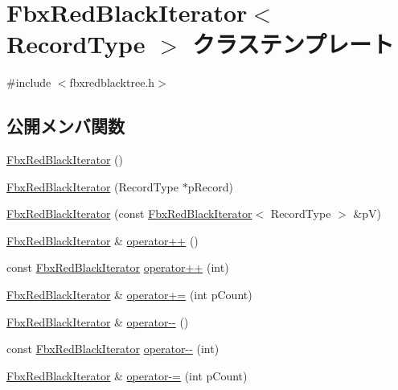 \hypertarget{class_fbx_red_black_iterator}{}\section{Fbx\+Red\+Black\+Iterator$<$ Record\+Type $>$ クラステンプレート}
\label{class_fbx_red_black_iterator}


{\ttfamily \#include $<$fbxredblacktree.\+h$>$}

\subsection*{公開メンバ関数}
\begin{DoxyCompactItemize}
\item 
\hyperlink{class_fbx_red_black_iterator_ad65b0d26a7a2baff0214104479303833}{Fbx\+Red\+Black\+Iterator} ()
\item 
\hyperlink{class_fbx_red_black_iterator_a596005a983b700722325897b905de913}{Fbx\+Red\+Black\+Iterator} (Record\+Type $\ast$p\+Record)
\item 
\hyperlink{class_fbx_red_black_iterator_a746e622a5d8be2f6ff7b48314b418c9d}{Fbx\+Red\+Black\+Iterator} (const \hyperlink{class_fbx_red_black_iterator}{Fbx\+Red\+Black\+Iterator}$<$ Record\+Type $>$ \&pV)
\item 
\hyperlink{class_fbx_red_black_iterator}{Fbx\+Red\+Black\+Iterator} \& \hyperlink{class_fbx_red_black_iterator_a1ea196cc2fcdc233f26ba205741c8d08}{operator++} ()
\item 
const \hyperlink{class_fbx_red_black_iterator}{Fbx\+Red\+Black\+Iterator} \hyperlink{class_fbx_red_black_iterator_a58492d2dddc2067ca0cec9bd8348d2cd}{operator++} (int)
\item 
\hyperlink{class_fbx_red_black_iterator}{Fbx\+Red\+Black\+Iterator} \& \hyperlink{class_fbx_red_black_iterator_aced77a1a0958e3f5d0b8f1a9cc47b42d}{operator+=} (int p\+Count)
\item 
\hyperlink{class_fbx_red_black_iterator}{Fbx\+Red\+Black\+Iterator} \& \hyperlink{class_fbx_red_black_iterator_a586034c7ed6bf9ecdda3e21861d51a11}{operator-\/-\/} ()
\item 
const \hyperlink{class_fbx_red_black_iterator}{Fbx\+Red\+Black\+Iterator} \hyperlink{class_fbx_red_black_iterator_a29bd733723bc879fb8057d7ae55279b4}{operator-\/-\/} (int)
\item 
\hyperlink{class_fbx_red_black_iterator}{Fbx\+Red\+Black\+Iterator} \& \hyperlink{class_fbx_red_black_iterator_ab659f3099189e3b8f9b3c1dd12c7b6bd}{operator-\/=} (int p\+Count)

\end{DoxyCompactItemize}
